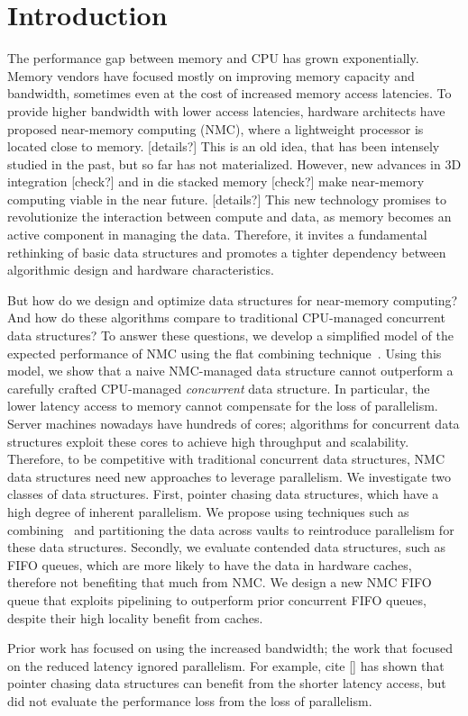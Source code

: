 \section{Introduction}


The performance gap between memory and CPU has grown exponentially. Memory vendors have focused mostly on improving memory capacity and bandwidth, sometimes even at the cost of increased memory access latencies. To provide higher bandwidth with lower access latencies, hardware architects have proposed near-memory computing (NMC), where a lightweight processor is located close to memory. [details?] This is an old idea, that has been intensely studied in the past, but so far has not materialized. However, new advances in 3D integration [check?] and in die stacked memory [check?] make near-memory computing viable in the near future. [details?] This new technology promises to revolutionize the interaction between compute and data, as memory becomes an active component in managing the data. Therefore, it invites a fundamental rethinking of basic data structures and promotes a tighter dependency between algorithmic design and hardware characteristics. 

But how do we design and optimize data structures for near-memory computing? And how do these algorithms compare to traditional CPU-managed concurrent data structures? To answer these questions, we develop a simplified model of the expected performance of NMC using the flat combining technique~\cite{}. Using this model, we show that a naive NMC-managed data structure cannot outperform a carefully crafted CPU-managed \emph{concurrent} data structure. In particular, the lower latency access to memory cannot compensate for the loss of parallelism. Server machines nowadays have hundreds of cores; algorithms for concurrent data structures exploit these cores to achieve high throughput and scalability. Therefore, to be competitive with traditional concurrent data structures, NMC data structures need new approaches to leverage parallelism. We investigate two classes of data structures. First, pointer chasing data structures, which have a high degree of inherent parallelism. We propose using techniques such as combining~\cite{} and partitioning the data across vaults to reintroduce parallelism for these data structures. Secondly, we evaluate contended data structures, such as FIFO queues, which are more likely to have the data in hardware caches, therefore not benefiting that much from NMC. We design a new NMC FIFO queue that exploits pipelining to outperform prior concurrent FIFO queues, despite their high locality benefit from caches. 

Prior work has focused on using the increased bandwidth; the work that focused on the reduced latency ignored parallelism. For example, cite [] has shown that pointer chasing data structures can benefit from the shorter latency access, but did not evaluate the performance loss from the loss of parallelism. 

